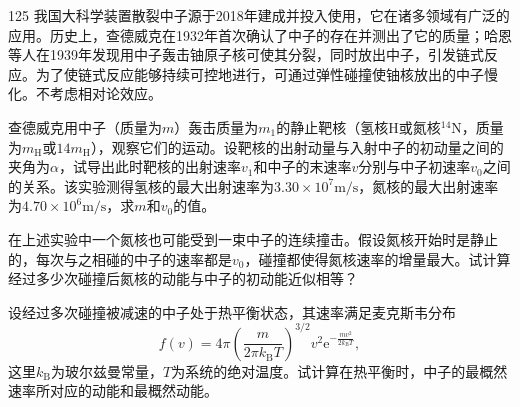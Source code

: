 \begin{problem}[第37届全国中学生物理竞赛决赛][散裂中子源与中子慢化]{125}
    我国大科学装置散裂中子源于2018年建成并投入使用，它在诸多领域有广泛的应用。历史上，查德威克在1932年首次确认了中子的存在并测出了它的质量；哈恩等人在1939年发现用中子轰击铀原子核可使其分裂，同时放出中子，引发链式反应。为了使链式反应能够持续可控地进行，可通过弹性碰撞使铀核放出的中子慢化。不考虑相对论效应。
    \begin{subproblem}
        查德威克用中子（质量为$m$）轰击质量为$m _ { 1 }$的静止靶核（氢核$\mathrm{H}$或氮核$^{14}\mathrm{N}$，质量为$m _ { \mathrm { H } }$或$14 m _ { \mathrm { H } }$），观察它们的运动。设靶核的出射动量与入射中子的初动量之间的夹角为$\alpha$，试导出此时靶核的出射速率$v _ { 1 }$和中子的末速率$v$分别与中子初速率$v _ { 0 }$之间的关系。该实验测得氢核的最大出射速率为$3.30 \times 10^{7} \mathrm{m/s}$，氮核的最大出射速率为$4.70 \times 10^{6} \mathrm{m/s}$，求$m$和$v _ { 0 }$的值。
    \end{subproblem}
    \begin{subproblem}
        在上述实验中一个氮核也可能受到一束中子的连续撞击。假设氮核开始时是静止的，每次与之相碰的中子的速率都是$v _ { 0 }$，碰撞都使得氮核速率的增量最大。试计算经过多少次碰撞后氮核的动能与中子的初动能近似相等？
    \end{subproblem}
    \begin{subproblem}
        设经过多次碰撞被减速的中子处于热平衡状态，其速率满足麦克斯韦分布
        \begin{equation}
            f(v) = 4 \pi \left(\frac {m}{2 \pi k _ {\mathrm{B}} T}\right) ^ {3 / 2} v ^ {2} \mathrm{e} ^ {- \frac {m v ^ {2}}{2 k _ {\mathrm{B}} T}},
            \label{eq:1.p125}
        \end{equation}
        这里$k _ { \mathrm { B } }$为玻尔兹曼常量，$T$为系统的绝对温度。试计算在热平衡时，中子的最概然速率所对应的动能和最概然动能。
    \end{subproblem}
\end{problem}